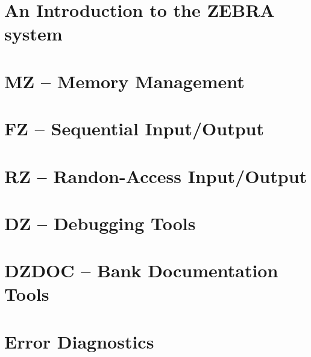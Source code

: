 
\setcounter{page}{1}
\part{An Introduction to the ZEBRA system}

\part{MZ -- Memory Management}





\part{FZ -- Sequential Input/Output}





\part{RZ -- Randon-Access Input/Output}


\part{DZ -- Debugging Tools}


\part{DZDOC -- Bank Documentation Tools}

\part{Error Diagnostics}

\appendix






